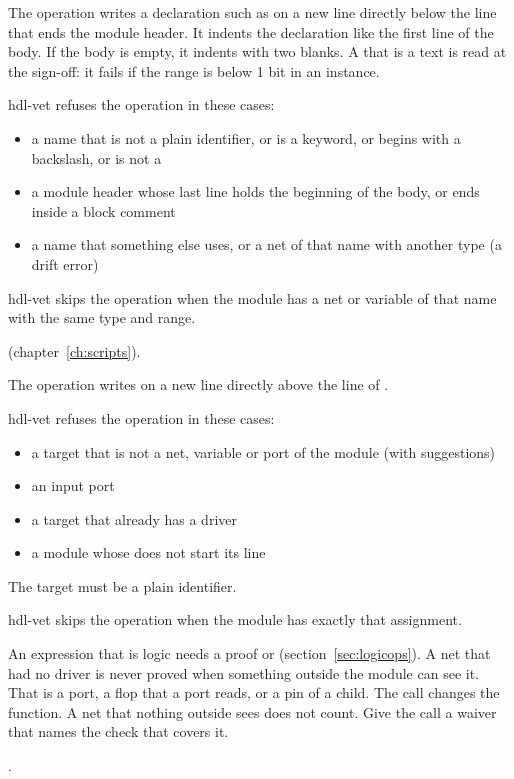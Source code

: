\begin{entry}{}
\item[Writes] The operation writes a declaration such as  on a
  new line directly below the line that ends the module header. It indents the
  declaration like the first line of the body. If the body is empty, it indents with two
  blanks. A  that is a text is read at the sign-off: it fails if the range
  is below 1 bit in an instance.
\item[Refused] hdl-vet refuses the operation in these cases:
  \begin{itemize}
  \item a name that is not a plain identifier, or is a keyword, or begins with a
    backslash, or is not a 
  \item a module header whose last line holds the beginning of the body, or ends inside a
    block comment
  \item a name that something else uses, or a net of that name with another type (a drift
    error)
  \end{itemize}
\item[Again] hdl-vet skips the operation when the module has a net or variable of that name
  with the same type and range.
\item[Example]  (chapter~\ref{ch:scripts}).
\end{entry}

\begin{entry}{}
\item[Writes] The operation writes  on a new line directly
  above the line of .
\item[Refused] hdl-vet refuses the operation in these cases:
  \begin{itemize}
  \item a target that is not a net, variable or port of the module (with suggestions)
  \item an input port
  \item a target that already has a driver
  \item a module whose  does not start its line
  \end{itemize}
  The target must be a plain identifier.
\item[Again] hdl-vet skips the operation when the module has exactly that assignment.
\item[Waiver] An expression that is logic needs a proof or 
  (section~\ref{sec:logicops}). A net that had no driver is never proved when
  something outside the module can see it. That is a port, a flop that a port reads, or a
  pin of a child. The call changes the function. A net that nothing outside sees does not
  count. Give the call a waiver that names the check that covers it.
\item[Example] .
\end{entry}

